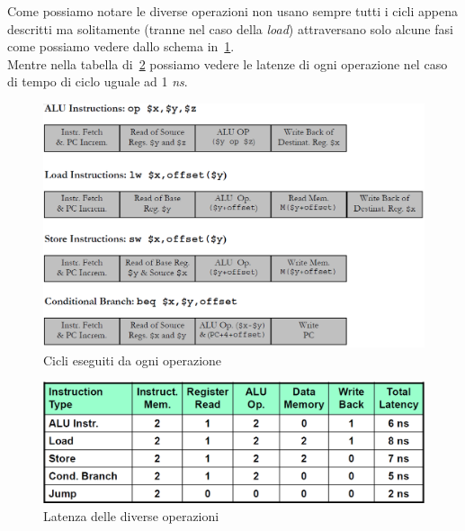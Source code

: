 Come possiamo notare le diverse operazioni non usano sempre tutti i cicli appena descritti ma solitamente (tranne nel caso della \emph{load}) attraversano solo alcune fasi come possiamo vedere dallo schema in \figurename\,\ref{fig:cicli}.\\
Mentre nella tabella di \figurename\,\ref{fig:latency} possiamo vedere le latenze di ogni operazione nel caso di tempo di ciclo uguale ad 1 \emph{ns}.
\begin{figure}[htb]
\centering
\includegraphics[scale=0.5]{img/cicli.png}
\caption{Cicli eseguiti da ogni operazione}\label{fig:cicli}
\end{figure}
\begin{figure}[htb]
\centering
\includegraphics[scale=0.4]{img/latency.png}
\caption{Latenza delle diverse operazioni}\label{fig:latency}
\end{figure}
